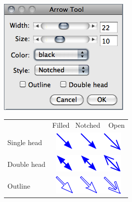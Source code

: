 \begin{minipage}[c][1\totalheight][t]{0.348\columnwidth}%
\vspace*{15pt}
\includegraphics[scale=0.55]{images/ArrowTool}\vspace*{12pt}


\begin{spacing}{0.80000000000000004}
\noindent {\footnotesize }%
\begin{tabular}{>{\raggedright}b{7.8mm}c}
 & {\footnotesize Filled\,\,\ Notched\ \ \,Open}\tabularnewline
{\footnotesize Single head} & {\footnotesize \includegraphics[scale=0.65]{images/ArrowTypesS}}\tabularnewline
{\footnotesize Double head} & {\footnotesize \includegraphics[scale=0.65]{images/ArrowTypesD}}\tabularnewline
{\footnotesize Outline ~~~} & {\footnotesize \includegraphics[scale=0.65]{images/ArrowTypesO}}\tabularnewline
\end{tabular}\end{spacing}
%
\end{minipage}%
